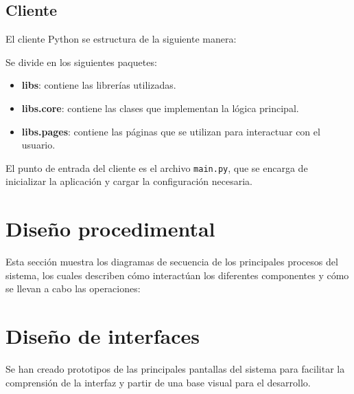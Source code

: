 
\subsection{Cliente}

El cliente Python se estructura de la siguiente manera:


Se divide en los siguientes paquetes:
\begin{itemize}
    \item \textbf{libs}: contiene las librerías utilizadas.
    \item \textbf{libs.core}: contiene las clases que implementan la lógica principal.
    \item \textbf{libs.pages}: contiene las páginas que se utilizan para interactuar con el usuario.
\end{itemize}

El punto de entrada del cliente es el archivo \texttt{main.py}, que se encarga de inicializar la aplicación y
cargar la configuración necesaria.

\section{Diseño procedimental}

Esta sección muestra los diagramas de secuencia de los principales procesos del sistema, los cuales describen cómo interactúan
los diferentes componentes y cómo se llevan a cabo las operaciones:




\section{Diseño de interfaces}

Se han creado prototipos de las principales pantallas del sistema para facilitar la comprensión de la interfaz y partir
de una base visual para el desarrollo.


